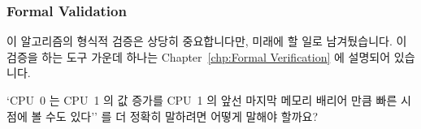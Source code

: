 \subsubsection{Formal Validation}
\label{app:rcuimpl:Formal Validation}

이 알고리즘의 형식적 검증은 상당히 중요합니다만, 미래에 할 일로 남겨뒀습니다.
이 검증을 하는 도구 가운데 하나는
Chapter~\ref{chp:Formal Verification} 에 설명되어 있습니다.

\QuickQuiz{}
	`CPU~0 는 CPU~1 의 값 증가를 CPU~1 의 앞선 마지막 메모리 배리어 만큼
	빠른 시점에 볼 수도 있다'' 를 더 정확히 말하려면 어떻게 말해야 할까요?
	\iffalse

